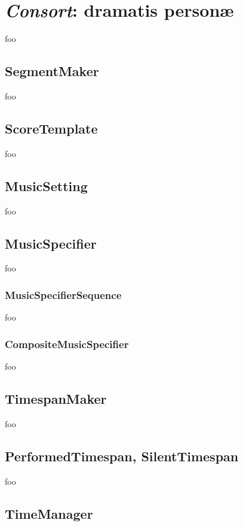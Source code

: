 \chapter{\emph{Consort}: dramatis person\ae}

foo

\section{SegmentMaker}

foo

\section{ScoreTemplate}

foo

\section{MusicSetting}

foo

\section{MusicSpecifier}

foo

\subsection{MusicSpecifierSequence}

foo

\subsection{CompositeMusicSpecifier}
foo


\section{TimespanMaker}

foo

\section{PerformedTimespan, SilentTimespan}

foo

\section{TimeManager}

